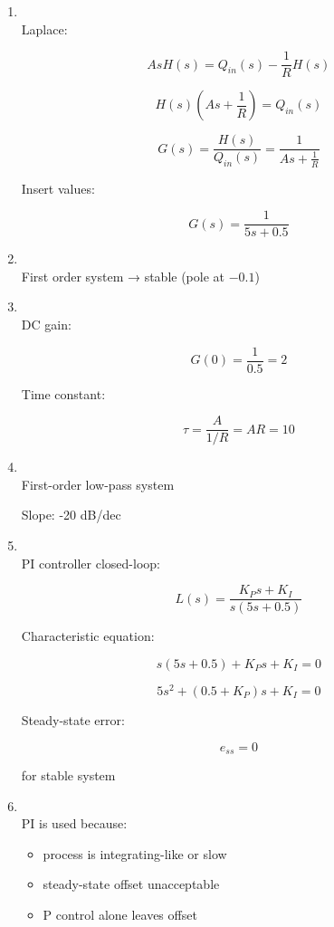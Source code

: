 \documentclass[a4paper,12pt]{article}
\begin{document}
\begin{enumerate}

\item[(a)]~\\

Laplace:

\[
AsH(s)=Q_{in}(s)-\frac{1}{R}H(s)
\]

\[
H(s)\left(As+\frac{1}{R}\right)=Q_{in}(s)
\]

\[
G(s)=\frac{H(s)}{Q_{in}(s)}=\frac{1}{As+\frac{1}{R}}
\]

Insert values:

\[
G(s)=\frac{1}{5s+0.5}
\]

\item[(b)]~\\

First order system → stable (pole at $-0.1$)

\item[(c)]~\\

DC gain:

\[
G(0)=\frac{1}{0.5}=2
\]

Time constant:

\[
\tau = \frac{A}{1/R} = AR = 10
\]

\item[(d)]~\\

First-order low-pass system

Slope: -20 dB/dec

\item[(e)]~\\

PI controller closed-loop:

\[
L(s)=\frac{K_P s+K_I}{s(5s+0.5)}
\]

Characteristic equation:

\[
s(5s+0.5)+K_P s+K_I=0
\]

\[
5s^2+(0.5+K_P)s+K_I=0
\]

Steady-state error:

\[
e_{ss}=0
\]

for stable system

\item[(f)]~\\

PI is used because:

\begin{itemize}
  \item process is integrating-like or slow
  \item steady-state offset unacceptable
  \item P control alone leaves offset
\end{itemize}

\end{enumerate}
\end{document}
